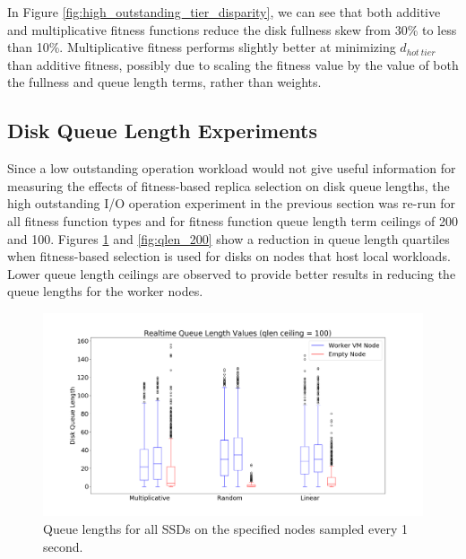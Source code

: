 \documentclass[12pt]{article}
\begin{document}
    In Figure \ref{fig:high_outstanding_tier_disparity}, we can see that both
    additive and multiplicative fitness functions reduce the disk fullness skew
    from 30\% to less than 10\%. Multiplicative fitness performs slightly
    better at minimizing $d_{hot\ tier}$ than additive fitness, possibly due to
    scaling the fitness value by the value of both the fullness and queue
    length terms, rather than weights.
  
  \subsection{Disk Queue Length Experiments}

  Since a low outstanding operation workload would not give useful
  information for measuring the effects of fitness-based replica selection on
  disk queue lengths, the high outstanding I/O operation experiment in the
  previous section was re-run for all fitness function types and for fitness
  function queue length term ceilings of 200 and 100. Figures
  \ref{fig:qlen_100} and \ref{fig:qlen_200} show a reduction in
  queue length quartiles when fitness-based selection is used for disks on
  nodes that host local workloads. Lower queue length ceilings are
  observed to provide better results in reducing the queue lengths for the
  worker nodes.

  \begin{figure}[!htb]
    \centering
    \includegraphics[scale=0.30]{images/qlen_100_box.png} 
    \caption{Queue lengths for all SSDs on the specified nodes sampled every 1
             second.}
    \label{fig:qlen_100}
  \end{figure}
\end{document}
